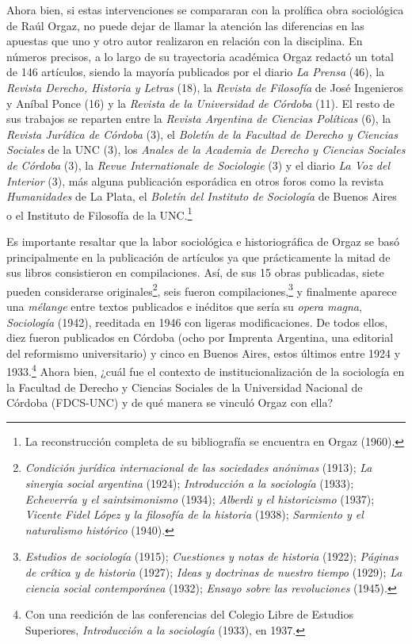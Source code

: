 Ahora bien, si estas intervenciones se compararan con la prolífica obra sociológica de Raúl Orgaz, no puede dejar de llamar la atención las diferencias en las apuestas que uno y otro autor realizaron en relación con la disciplina. En números precisos, a lo largo de su trayectoria académica Orgaz redactó un total de 146 artículos, siendo la mayoría publicados por el diario \emph{La Prensa} (46), la \emph{Revista Derecho, Historia y Letras} (18), la \emph{Revista de Filosofía} de José Ingenieros y Aníbal Ponce (16) y la \emph{Revista de la Universidad de Córdoba} (11). El resto de sus trabajos se reparten entre la \emph{Revista Argentina de Ciencias Políticas} (6), la \emph{Revista Jurídica de Córdoba} (3), el \emph{Boletín de la Facultad de Derecho y Ciencias Sociales} de la UNC (3), los \emph{Anales de la Academia de Derecho y Ciencias Sociales de Córdoba} (3), la \emph{Revue Internationale de Sociologie} (3) y el diario \emph{La Voz del Interior} (3), más alguna publicación esporádica en otros foros como la revista \emph{Humanidades} de La Plata, el \emph{Boletín del Instituto de Sociología} de Buenos Aires o el Instituto de Filosofía de la UNC.\footnote{La reconstrucción completa de su bibliografía se encuentra en Orgaz (1960).}

Es importante resaltar que la labor sociológica e historiográfica de Orgaz se basó principalmente en la publicación de artículos ya que prácticamente la mitad de sus libros consistieron en compilaciones. Así, de sus 15 obras publicadas, siete pueden considerarse originales\footnote{\emph{Condición jurídica internacional de las sociedades anónimas} (1913); \emph{La sinergia social argentina} (1924); \emph{Introducción a la sociología} (1933); \emph{Echeverría y el saintsimonismo} (1934); \emph{Alberdi y el historicismo} (1937); \emph{Vicente Fidel López y la filosofía de la historia} (1938); \emph{Sarmiento y el naturalismo histórico} (1940).}, seis fueron compilaciones,\footnote{\emph{Estudios de sociología} (1915); \emph{Cuestiones y notas de historia} (1922); \emph{Páginas de crítica y de historia} (1927); \emph{Ideas y doctrinas de nuestro tiempo} (1929); \emph{La ciencia social contemporánea} (1932); \emph{Ensayo sobre las revoluciones} (1945).} y finalmente aparece una \emph{mélange} entre textos publicados e inéditos que sería su \emph{opera magna}, \emph{Sociología} (1942), reeditada en 1946 con ligeras modificaciones. De todos ellos, diez fueron publicados en Córdoba (ocho por Imprenta Argentina, una editorial del reformismo universitario) y cinco en Buenos Aires, estos últimos entre 1924 y 1933.\footnote{Con una reedición de las conferencias del Colegio Libre de Estudios Superiores, \emph{Introducción a la sociología} (1933), en 1937.} Ahora bien, ¿cuál fue el contexto de institucionalización de la sociología en la Facultad de Derecho y Ciencias Sociales de la Universidad Nacional de Córdoba (FDCS-UNC) y de qué manera se vinculó Orgaz con ella?

